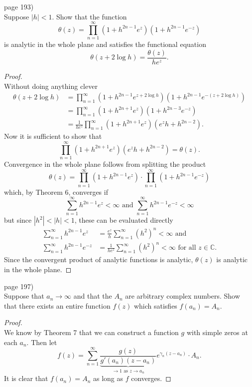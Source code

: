 \documentclass{article}
\newenvironment{problem}[2][Problem]{\begin{trivlist}
\item[\hskip \labelsep {\bfseries #1}\hskip \labelsep {\bfseries #2.}]}{\end{trivlist}}
\begin{document}
\begin{problem}{5} (page 193) \\
  Suppose $|h| < 1$. Show that the function \[
    \theta(z) = \prod_{n = 1}^\infty (1 + h^{2n-1}e^z)(1 + h^{2n-1}e^{-z})
  \] is analytic in the whole plane and satisfies the functional
  equation \[
    \theta(z + 2 \log h) = \frac{\theta(z)}{he^z}.
  \]
\end{problem}
\begin{proof} \text{} \\
  Without doing anything clever \begin{align*}
    \theta(z + 2\log h)
    &= \prod_{n = 1}^\infty (1 + h^{2n-1}e^{z + 2\log h})(1 + h^{2n-1}e^{-(z + 2\log h)}) \\
    &= \prod_{n = 1}^\infty (1 + h^{2n+1}e^z)(1 + h^{2n-3}e^{-z}) \\
    &= \frac{1}{he^z}\prod_{n = 1}^\infty (1 + h^{2n+1}e^z)(e^{z}h + h^{2n-2}).
  \end{align*}
  Now it is sufficient to show that \[
    \prod_{n = 1}^\infty (1 + h^{2n+1}e^z)(e^{z}h + h^{2n-2}) = \theta(z).
  \]
  Convergence in the whole plane follows from splitting the product \[
    \theta(z)
      = \prod_{n = 1}^\infty (1 + h^{2n-1}e^z) \cdot
      \prod_{n = 1}^\infty(1 + h^{2n-1}e^{-z})
  \] which, by Theorem 6, converges if \[
    \sum_{n = 1}^\infty h^{2n-1}e^z < \infty
    \text{ and }
    \sum_{n = 1}^\infty h^{2n-1}e^{-z} < \infty
  \] but since $|h^2| < |h| < 1$, these can be evaluated directly \begin{align*}
    \sum_{n = 1}^\infty h^{2n-1}e^z
    &= \frac{e^z}{h} \sum_{n = 1}^\infty (h^2)^n < \infty \text{ and}\\
    \sum_{n = 1}^\infty h^{2n-1}e^{-z}
    &= \frac{1}{he^z} \sum_{n = 1}^\infty (h^2)^n < \infty
    \text{ for all } z \in \mathbb{C}.
  \end{align*}
  Since the convergent product of analytic functions is analytic, $\theta(z)$
  is analytic in the whole plane.
\end{proof}
\pagebreak

\begin{problem}{1} (page 197) \\
  Suppose that $a_n \rightarrow \infty$ and that the $A_n$ are arbitrary
  complex numbers. Show that there exists an entire function $f(z)$ which
  satisfies $f(a_n) = A_n$.
\end{problem}
\begin{proof} \text{} \\
  We know by Theorem 7 that we can construct a function $g$ with simple zeros at
  each $a_n$. Then let \[
    f(z) = \sum_{n=1}^\infty \underbrace{\frac{g(z)}{g'(a_n)(z - a_n)}}_{\rightarrow 1 \text{ as } z \rightarrow a_n}e^{\gamma_n(z - a_n)}\cdot A_n.
  \]
  It is clear that $f(a_n) = A_n$ as long as $f$ converges.
\end{proof}
\pagebreak
\end{document}
